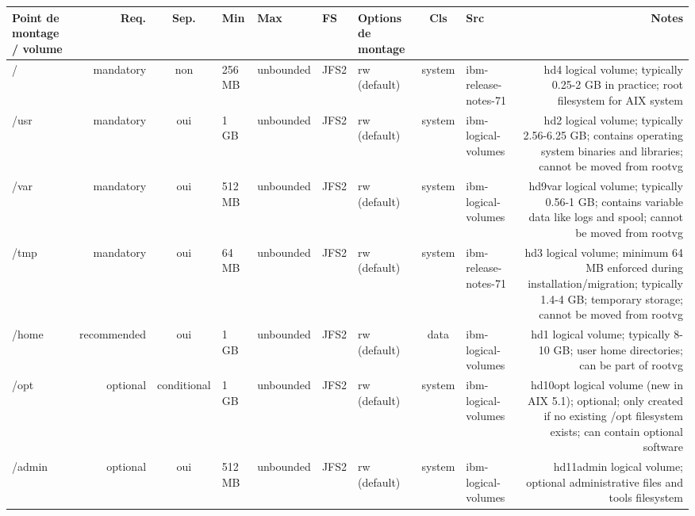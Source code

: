 \documentclass[10pt,a4paper]{article}
\renewcommand{\arraystretch}{1.2}
\begin{document}
{\renewcommand{\arraystretch}{1.15}\begin{longtable}{M R S Z Z T O C I N}\toprule\textbf{\normalfont\scriptsize Point de montage / volume} & \textbf{\normalfont\scriptsize Req.} & \textbf{\normalfont\scriptsize Sep.} & \textbf{\normalfont\scriptsize Min} & \textbf{\normalfont\scriptsize Max} & \textbf{\normalfont\scriptsize FS} & \textbf{\normalfont\scriptsize Options de montage} & \textbf{\normalfont\scriptsize Cls} & \textbf{\normalfont\scriptsize Src} & \textbf{\normalfont\scriptsize Notes}\\\midrule\endhead
/ & \textcolor{cBlock}{mandatory} & non & 256 MB & unbounded & JFS2 & rw (default) & system & ibm-release-notes-71 & hd4 logical volume; typically 0.25-2 GB in practice; root filesystem for AIX system\\
/usr & \textcolor{cBlock}{mandatory} & \textcolor{cOk}{oui} & 1 GB & unbounded & JFS2 & rw (default) & system & ibm-logical-volumes & hd2 logical volume; typically 2.56-6.25 GB; contains operating system binaries and libraries; cannot be moved from rootvg\\
/var & \textcolor{cBlock}{mandatory} & \textcolor{cOk}{oui} & 512 MB & unbounded & JFS2 & rw (default) & system & ibm-logical-volumes & hd9var logical volume; typically 0.56-1 GB; contains variable data like logs and spool; cannot be moved from rootvg\\
/tmp & \textcolor{cBlock}{mandatory} & \textcolor{cOk}{oui} & 64 MB & unbounded & JFS2 & rw (default) & system & ibm-release-notes-71 & hd3 logical volume; minimum 64 MB enforced during installation/migration; typically 1.4-4 GB; temporary storage; cannot be moved from rootvg\\
/home & \textcolor{cHigh}{recommended} & \textcolor{cOk}{oui} & 1 GB & unbounded & JFS2 & rw (default) & data & ibm-logical-volumes & hd1 logical volume; typically 8-10 GB; user home directories; can be part of rootvg\\
/opt & \textcolor{cLow}{optional} & conditional & 1 GB & unbounded & JFS2 & rw (default) & system & ibm-logical-volumes & hd10opt logical volume (new in AIX 5.1); optional; only created if no existing /opt filesystem exists; can contain optional software\\
/admin & \textcolor{cLow}{optional} & \textcolor{cOk}{oui} & 512 MB & unbounded & JFS2 & rw (default) & system & ibm-logical-volumes & hd11admin logical volume; optional administrative files and tools filesystem\\

\end{longtable}}
\end{document}
